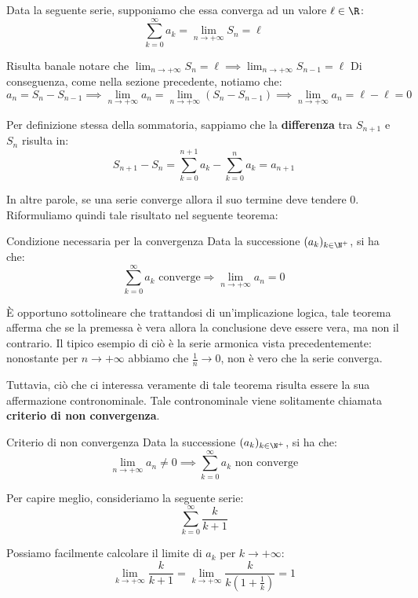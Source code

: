\documentclass[a4paper, 12pt]{report}
\begin{document}
    Data la seguente serie, supponiamo che essa converga ad un valore $\ell \in \R$:
    \[ \sum_{k = 0}^{\infty} a_k = \lim_{n \to +\infty} S_n = \ell\]
    
    Risulta banale notare che $\lim_{n \to +\infty} S_n = \ell \implies \lim_{n \to +\infty} S_{n-1} = \ell$
    Di conseguenza, come nella sezione precedente, notiamo che:
    \[a_{n} = S_{n} - S_{n-1} \implies \lim_{n \to +\infty} a_{n} = \lim_{n \to +\infty} (S_{n} - S_{n-1}) \implies \lim_{n \to +\infty} a_{n} = \ell - \ell = 0\]

    Per definizione stessa della sommatoria, sappiamo che la \textbf{differenza} tra $S_{n+1}$ e $S_n$ risulta in:
    \[ S_{n+1} - S_n = \sum_{k=0}^{n+1} a_k - \sum_{k=0}^{n} a_k = a_{n+1}\]

    In altre parole, se una serie converge allora il suo termine deve tendere 0. Riformuliamo quindi tale risultato nel seguente teorema:
    
    \begin{framedthm}{Condizione necessaria per la convergenza}
        Data la successione $(a_k)_{k \in \N^+}$, si ha che:
        \[\sum_{k = 0}^{\infty} a_k \text{ converge} \Longrightarrow \lim_{n \to +\infty} a_n = 0\]
    \end{framedthm}
    
    È opportuno sottolineare che trattandosi di un'implicazione logica, tale teorema afferma che se la premessa è vera allora la conclusione deve essere vera, ma non il contrario. Il tipico esempio di ciò è la serie armonica vista precedentemente: nonostante per $n \to +\infty$ abbiamo che $\frac{1}{n} \to 0$, non è vero che la serie converga. 
        
    Tuttavia, ciò che ci interessa veramente di tale teorema risulta essere la sua affermazione contronominale. Tale contronominale viene solitamente chiamata \textbf{criterio di non convergenza}.

    \begin{framedcor}{Criterio di non convergenza}
        Data la successione $(a_k)_{k \in \N^+}$, si ha che:
        \[\lim_{n \to +\infty} a_n \neq 0 \implies \sum_{k = 0}^{\infty} a_k \text{ non converge}\]
    \end{framedcor}
    
    Per capire meglio, consideriamo la seguente serie:
    \[ \sum_{k=0}^{\infty} \frac{k}{k+1} \]
    
    Possiamo facilmente calcolare il limite di $a_k$ per $k \to +\infty$:
    \[ \lim_{k \to +\infty} \frac{k}{k+1} = \lim_{k \to +\infty} \frac{k}{k(1 + \frac{1}{k})} = 1\]
    
\end{document}
